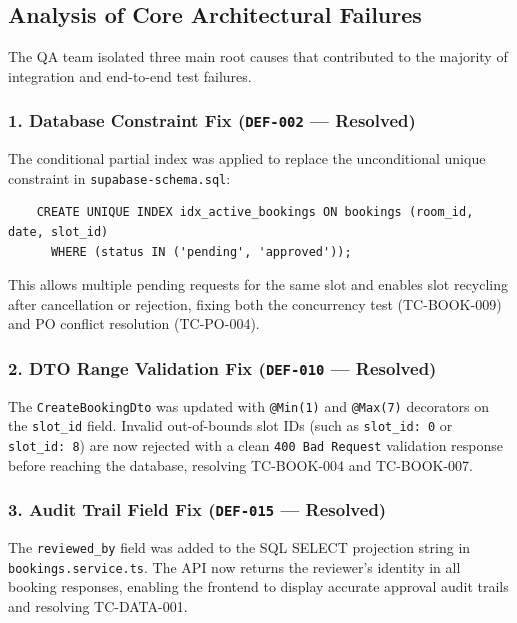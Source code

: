 \documentclass[11pt,a4paper]{article}
\begin{document}
\subsection{Analysis of Core Architectural Failures}
The QA team isolated three main root causes that contributed to the majority of integration and end-to-end test failures.

\subsubsection{1. Database Constraint Fix (\texttt{DEF-002} --- Resolved)}
The conditional partial index was applied to replace the unconditional unique constraint in \texttt{supabase-schema.sql}:
\begin{verbatim}
    CREATE UNIQUE INDEX idx_active_bookings ON bookings (room_id, date, slot_id)
      WHERE (status IN ('pending', 'approved'));
\end{verbatim}
This allows multiple pending requests for the same slot and enables slot recycling after cancellation or rejection, fixing both the concurrency test (TC-BOOK-009) and PO conflict resolution (TC-PO-004).

\subsubsection{2. DTO Range Validation Fix (\texttt{DEF-010} --- Resolved)}
The \texttt{CreateBookingDto} was updated with \texttt{@Min(1)} and \texttt{@Max(7)} decorators on the \texttt{slot\_id} field. Invalid out-of-bounds slot IDs (such as \texttt{slot\_id: 0} or \texttt{slot\_id: 8}) are now rejected with a clean \texttt{400 Bad Request} validation response before reaching the database, resolving TC-BOOK-004 and TC-BOOK-007.

\subsubsection{3. Audit Trail Field Fix (\texttt{DEF-015} --- Resolved)}
The \texttt{reviewed\_by} field was added to the SQL SELECT projection string in \texttt{bookings.service.ts}. The API now returns the reviewer's identity in all booking responses, enabling the frontend to display accurate approval audit trails and resolving TC-DATA-001.

\newpage

\end{document}
